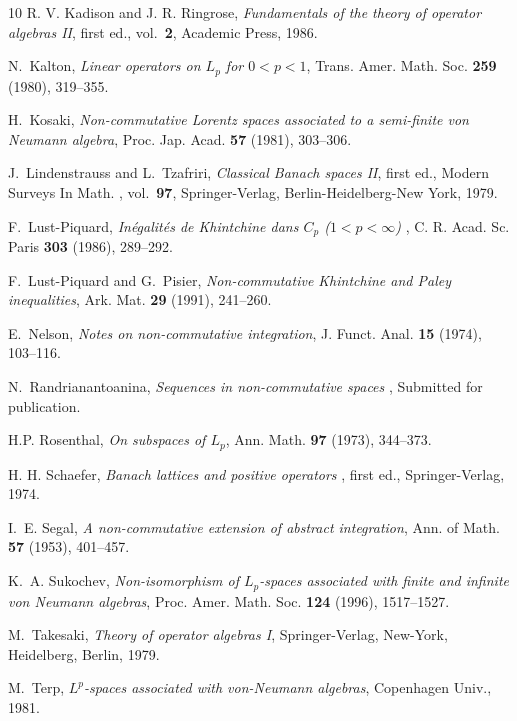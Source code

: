 \documentclass[12pt]{amsart}
\numberwithin{equation}{section}
\numberwithin{theorem}{section}
\begin{document}
\begin{thebibliography}{10}
{R. V.} Kadison and {J. R.} Ringrose, \emph{{\it Fundamentals of the theory of
  operator algebras II}}, first ed., vol.~{\bf 2}, Academic Press, 1986.

N.~Kalton, \emph{{\it Linear operators on $L_p$ for $0<p<1$}}, {\rm Trans.
  Amer. Math. Soc.} \textbf{{\bf 259}} (1980), 319--355.

H.~Kosaki, \emph{{\it Non-commutative Lorentz spaces associated to a
  semi-finite von Neumann algebra}}, {\rm Proc. Jap. Acad.} \textbf{{\bf 57}}
  (1981), 303--306.

J.~Lindenstrauss and L.~Tzafriri, \emph{{\it Classical Banach spaces II}},
  first ed., {\rm Modern Surveys In Math. }, vol.~{\bf 97}, Springer-Verlag,
  Berlin-Heidelberg-New York, 1979.

F.~Lust-Piquard, \emph{{\it In\'egalit\'es de Khintchine dans $C_p$
  ($1<p<\infty$) }}, {\rm C. R. Acad. Sc. Paris } \textbf{{\bf 303 }} (1986),
  289--292.

F.~{Lust-Piquard} and G.~Pisier, \emph{{\it Non-commutative Khintchine and
  Paley inequalities}}, {\rm Ark. Mat. } \textbf{{\bf 29 }} (1991), 241--260.

E.~Nelson, \emph{{\it Notes on non-commutative integration}}, {\rm J. Funct.
  Anal.} \textbf{{\bf 15}} (1974), 103--116.

N.~Randrianantoanina, \emph{{\it Sequences in non-commutative spaces }},
  Submitted for publication.

H.P. Rosenthal, \emph{{\it On subspaces of $L_p$}}, {\rm Ann. Math.}
  \textbf{{\bf 97}} (1973), 344--373.

{H. H.} Schaefer, \emph{{\it Banach lattices and positive operators }}, first
  ed., Springer-Verlag, 1974.

I.~E. Segal, \emph{{\it A non-commutative extension of abstract integration}},
  {\rm Ann. of Math.} \textbf{{\bf 57}} (1953), 401--457.

K.~A. Sukochev, \emph{{\it Non-isomorphism of $L_p$-spaces associated with
  finite and infinite von Neumann algebras}}, {\rm Proc. Amer. Math. Soc.}
  \textbf{{\bf 124}} (1996), 1517--1527.

M.~Takesaki, \emph{{\it Theory of operator algebras I}}, Springer-Verlag,
  New-York, Heidelberg, Berlin, 1979.

M.~Terp, \emph{{\it $L^p$-spaces associated with von-Neumann algebras}},
  Copenhagen Univ., 1981.


\end{thebibliography}
\end{document}
